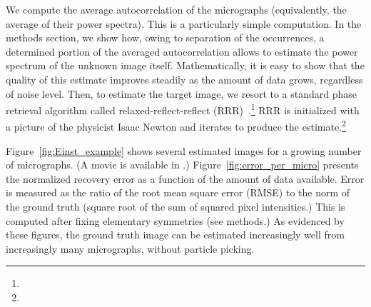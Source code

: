 \documentclass[english,11pt]{article}
\newcommand{\1}{\mathbf{1}}
\newcommand{\TODO}[1]{{\color{red}{[#1]}}}
\numberwithin{equation}{section}
\theoremstyle{plain}
\theoremstyle{definition}
\theoremstyle{remark}
\theoremstyle{plain}
\theoremstyle{remark}
\theoremstyle{plain}
\theoremstyle{plain}
\begin{document}
We compute the average autocorrelation of the micrographs (equivalently, the average of their power spectra). This is a particularly simple computation. In the methods section, we show how, owing to separation of the occurrences, a determined portion of the averaged autocorrelation allows to estimate the power spectrum of the unknown image itself. Mathematically, it is easy to show that the quality of this estimate improves steadily as the amount of data grows, regardless of noise level. Then, to estimate the target image, we resort to a standard phase retrieval algorithm called relaxed-reflect-reflect (RRR)~\cite{bauschke2004rrr,elser2017rrr}.\footnote{\TODO{What about biased terms? Do we need to know $\sigma$ in the 2D experiment? What about the number of occurrences, do we need to know that? Quid of symmetries? And quid first order moments?}} RRR is initialized with a picture of the physicist Isaac Newton and iterates to produce the estimate.\footnote{\TODO{Initializing with a face is debatable: it might helps the algorithm. On the other hand, I agree that it supports the notion that we don't get trapped too easily.}}

Figure~\ref{fig:Einst_example} shows several estimated images for a growing number of micrographs. (A movie is available in \TODO{supplementary material}.) Figure~\ref{fig:error_per_micro} presents the normalized recovery error as a function of the amount of data available. Error is measured as the ratio of the root mean square error (RMSE) to the norm of the ground truth (square root of the sum of squared pixel intensities.) This is computed after fixing elementary symmetries (see methods.) As evidenced by these figures, the ground truth image can be estimated increasingly well from increasingly many micrographs, without particle picking.



\end{document}
